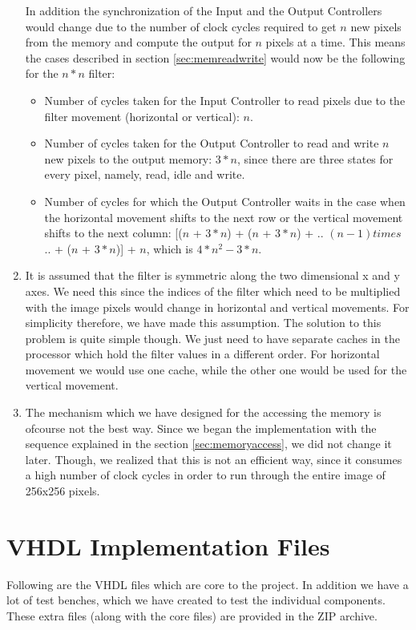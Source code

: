 \documentclass[11pt,a4paper]{article}
\begin{document}
\begin{enumerate}
	In addition the synchronization of the Input and the Output Controllers would change due to the number of clock cycles required to get $n$ new pixels from the memory and compute the output for $n$ pixels at a time. This means the cases described in section \ref{sec:memreadwrite} would now be the following for the $n*n$ filter:
		\begin{itemize}
		\item Number of cycles taken for the Input Controller to read pixels due to the filter movement (horizontal or vertical): $n$.
		\item Number of cycles taken for the Output Controller to read and write $n$ new pixels to the output memory: $3*n$, since there are three states for every pixel, namely, read, idle and write.
		\item Number of cycles for which the Output Controller waits in the case when the horizontal movement shifts to the next row or the vertical movement shifts to the next column: [($n$ + $3*n$) + ($n$ + $3*n$) + .. $(n-1) times$ .. + ($n$ + $3*n$)] + $n$, which is $4*n^2 - 3*n$.
	\end{itemize}	

	
	
\item It is assumed that the filter is symmetric along the two dimensional x and y axes. We need this since the indices of the filter which need to be multiplied with the image pixels would change in horizontal and vertical movements. For simplicity therefore, we have made this assumption.
The solution to this problem is quite simple though. We just need to have separate caches in the processor which hold the filter values in a different order. For horizontal movement we would use one cache, while the other one would be used for the vertical movement.

\item The mechanism which we have designed for the accessing the memory is ofcourse not the best way. Since we began the implementation with the sequence explained in the section \ref{sec:memoryaccess}, we did not change it later. Though, we realized that this is not an efficient way, since it consumes a high number of clock cycles in order to run through the entire image of 256x256 pixels.
\end{enumerate}	

\newpage
\section{VHDL Implementation Files}
\label{section:impl}
Following are the VHDL files which are core to the project. In addition we have a lot of test benches, which we have created to test the individual components. These extra files (along with the core files) are provided in the ZIP archive. 
\end{document}
